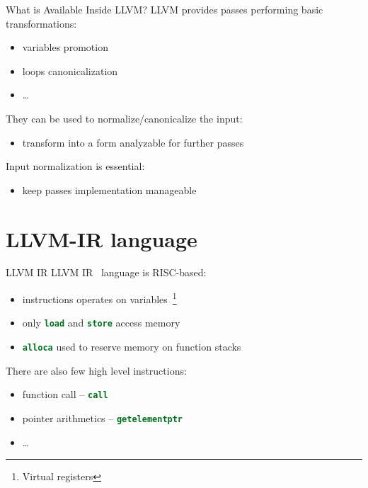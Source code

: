 \documentclass[10pt,mathserif]{beamer}
\newcommand{\llvminline}[1]{\lstinline[language=LLVM]!#1!}
\begin{document}
\begin{frame}{What is Available Inside LLVM?}
LLVM provides passes performing basic transformations:

\begin{itemize}
\item variables promotion
\item loops canonicalization
\item \ldots
\end{itemize}

They can be used to \alert{normalize/canonicalize} the input:

\begin{itemize}
\item transform into a form analyzable for further passes
\end{itemize}

Input normalization is \alert{essential}:

\begin{itemize}
\item keep passes implementation manageable
\end{itemize}
\end{frame}

\section{LLVM-IR language}
\begin{frame}{LLVM IR}
LLVM IR~\cite{LOCAL:www/llvmLanguageRef} language is RISC-based:

\begin{itemize}
\item instructions operates on \alert{variables}~\footnote{Virtual registers}
\item only \llvminline{load} and \llvminline{store} access memory
\item \llvminline{alloca} used to reserve memory on function stacks
\end{itemize}
\vfill
There are also few \alert{high level instructions}:
\begin{itemize}
\item function call -- \llvminline{call}
\item pointer arithmetics -- \llvminline{getelementptr}
\item \ldots
\end{itemize}
\end{frame}
\end{document}
